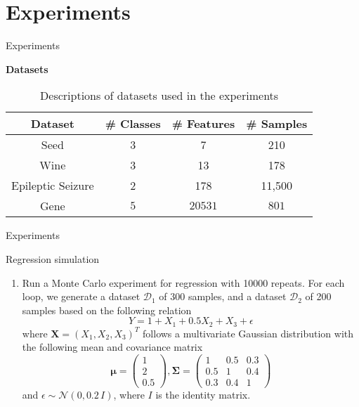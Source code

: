 \documentclass[xcolor={dvipsnames}]{beamer} %
\begin{document}
\section{Experiments}
\begin{frame}{Experiments}
    \begin{block}{\textbf{Datasets}}
        \begin{table}[htbp]
\begin{center}
\caption{Descriptions of datasets used in the experiments}
    \begin{tabular}{|c|c|c|c|}
		\hline
		Dataset & \# Classes & \# Features & \# Samples \\
		\hline
		Seed & 3 & 7 & 210\\\hline
		Wine & 3 & 13 & 178 \\\hline
		Epileptic Seizure & 2 &  178 &  11,500\\\hline
		Gene & $5$ & $20531$ & $801$ \\\hline
	\end{tabular}
	\label{table_info_datasets}
\end{center}
\end{table}
    \end{block}
\end{frame}

\begin{frame}{Experiments}
    \begin{block}{Regression simulation}
    \begin{enumerate}
        \item Run a Monte Carlo experiment for regression with 10000 repeats. For each loop, we generate a dataset $\mathcal{D}_1$ of 300 samples, and a dataset $\mathcal{D}_2$ of 200 samples  based on the following relation
         \begin{equation}
             Y = 1 + X_1+0.5X_2+X_3+\epsilon 
         \end{equation}
        where $\mathbf{X} = (X_1, X_2, X_3)^T$ follows a multivariate Gaussian distribution with the following mean and covariance matrix
\begin{equation}
    \boldsymbol {\mu }=\begin{pmatrix}
        1\\2\\0.5   
    \end{pmatrix}, 
    \mathbf{\Sigma} = \begin{pmatrix}
        1 & 0.5 & 0.3\\
        0.5 & 1 & 0.4\\
        0.3 & 0.4 & 1
    \end{pmatrix} 
\end{equation}
and $\epsilon \sim \mathcal{ N}(0,0.2\,I)$, where $I$ is the identity matrix.
    \end{enumerate}
    \end{block}
\end{frame}
\end{document}
